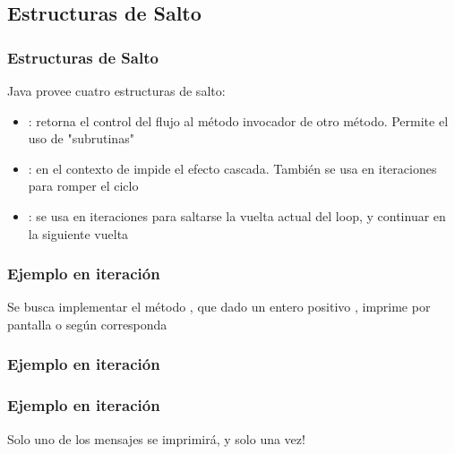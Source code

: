 \documentclass{beamer}
\begin{document}
\subsection{Estructuras de Salto}

\begin{frame}
  \frametitle{Estructuras de Salto}
  
  Java provee cuatro estructuras de salto:
  \begin{itemize}

  \item{}: retorna el control del flujo al método
    invocador de otro método. Permite el uso de "subrutinas"
    
  \item {}: en el contexto de  impide el
    efecto cascada. También se usa en iteraciones para
    romper el ciclo
    
  \item {}: se usa en iteraciones para saltarse la
    vuelta actual del loop, y continuar en la siguiente vuelta

  \end{itemize}
\end{frame}

\begin{frame}
  \frametitle{Ejemplo  en iteración}

  \begin{block}{}
    Se busca implementar el método , que dado un entero
    positivo , imprime por pantalla  o
     según corresponda
  \end{block}
  
\end{frame}


\begin{frame}[fragile]
  \frametitle{Ejemplo  en iteración}

\end{frame}

\begin{frame}[fragile]
  \frametitle{Ejemplo  en iteración}

  Solo uno de los mensajes se imprimirá, y solo una vez!
\end{frame}
\end{document}
